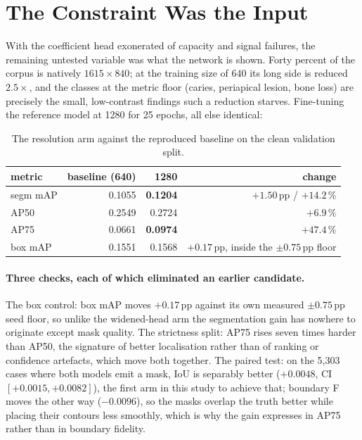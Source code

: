 \documentclass[11pt,letterpaper]{article}
\begin{document}
\section{The Constraint Was the Input}
\label{sec:input}

With the coefficient head exonerated of capacity and signal failures, the
remaining untested variable was what the network is shown. Forty percent of
the corpus is natively $1615\times840$; at the training size of 640 its long
side is reduced $2.5\times$, and the classes at the metric floor (caries,
periapical lesion, bone loss) are precisely the small, low-contrast findings
such a reduction starves. Fine-tuning the reference model at 1280 for 25
epochs, all else identical:

\begin{table}[h]
\centering\small
\begin{tabular}{lrrr}
\toprule
metric & baseline (640) & 1280 & change \\
\midrule
segm mAP & 0.1055 & \textbf{0.1204} & $+1.50$\,pp / $+14.2$\,\% \\
AP50 & 0.2549 & 0.2724 & $+6.9$\,\% \\
AP75 & 0.0661 & \textbf{0.0974} & $+47.4$\,\% \\
box mAP & 0.1551 & 0.1568 & $+0.17$\,pp, inside the $\pm0.75$\,pp floor \\
\bottomrule
\end{tabular}
\caption{The resolution arm against the reproduced baseline on the clean
validation split.}
\end{table}

\paragraph{Three checks, each of which eliminated an earlier candidate.}
The box control: box mAP moves $+0.17$\,pp against its own measured
$\pm0.75$\,pp seed floor, so unlike the widened-head arm the segmentation gain
has nowhere to originate except mask quality. The strictness split: AP75
rises seven times harder than AP50, the signature of better localisation
rather than of ranking or confidence artefacts, which move both together. The
paired test: on the 5{,}303 cases where both models emit a mask, IoU is
separably better ($+0.0048$, CI $[+0.0015,+0.0082]$), the first arm in this
study to achieve that; boundary F moves the other way ($-0.0096$), so the
masks overlap the truth better while placing their contours less smoothly,
which is why the gain expresses in AP75 rather than in boundary fidelity.
\end{document}
